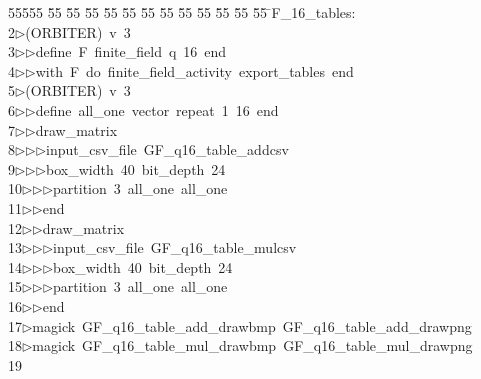 %
%
\begin{tabbing}
55555 \= 55 \= 55 \= 55 \= 55 \= 55 \= 55 \= 55 \= 55 \= 55 \= 55 \= 55 \= 55 \= \>F\_16\_tables:\\[0pt]
2\>$\triangleright$\>(ORBITER)\ v\ 3\ \\[0pt]
3\>$\triangleright$\>$\triangleright$\>define\ F\ finite\_field\ q\ 16\ end\ \\[0pt]
4\>$\triangleright$\>$\triangleright$\>with\ F\ do\ finite\_field\_activity\ export\_tables\ end\\[0pt]
5\>$\triangleright$\>(ORBITER)\ v\ 3\ \\[0pt]
6\>$\triangleright$\>$\triangleright$\>define\ all\_one\ vector\ repeat\ 1\ 16\ end\ \\[0pt]
7\>$\triangleright$\>$\triangleright$\>draw\_matrix\ \\[0pt]
8\>$\triangleright$\>$\triangleright$\>$\triangleright$\>input\_csv\_file\ GF\_q16\_table\_addcsv\ \\[0pt]
9\>$\triangleright$\>$\triangleright$\>$\triangleright$\>box\_width\ 40\ bit\_depth\ 24\ \\[0pt]
10\>$\triangleright$\>$\triangleright$\>$\triangleright$\>partition\ 3\ all\_one\ all\_one\ \\[0pt]
11\>$\triangleright$\>$\triangleright$\>end\ \\[0pt]
12\>$\triangleright$\>$\triangleright$\>draw\_matrix\ \\[0pt]
13\>$\triangleright$\>$\triangleright$\>$\triangleright$\>input\_csv\_file\ GF\_q16\_table\_mulcsv\ \\[0pt]
14\>$\triangleright$\>$\triangleright$\>$\triangleright$\>box\_width\ 40\ bit\_depth\ 24\ \\[0pt]
15\>$\triangleright$\>$\triangleright$\>$\triangleright$\>partition\ 3\ all\_one\ all\_one\ \\[0pt]
16\>$\triangleright$\>$\triangleright$\>end\\[0pt]
17\>$\triangleright$\>magick\ GF\_q16\_table\_add\_drawbmp\ GF\_q16\_table\_add\_drawpng\\[0pt]
18\>$\triangleright$\>magick\ GF\_q16\_table\_mul\_drawbmp\ GF\_q16\_table\_mul\_drawpng\\[0pt]
19\>\end{tabbing}
